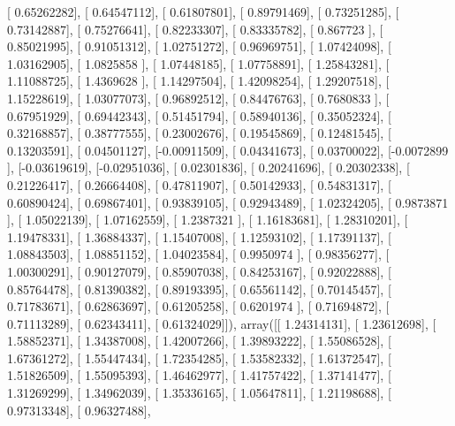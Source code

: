 \documentclass{article}
\begin{document}
       [ 0.65262282],
       [ 0.64547112],
       [ 0.61807801],
       [ 0.89791469],
       [ 0.73251285],
       [ 0.73142887],
       [ 0.75276641],
       [ 0.82233307],
       [ 0.83335782],
       [ 0.867723  ],
       [ 0.85021995],
       [ 0.91051312],
       [ 1.02751272],
       [ 0.96969751],
       [ 1.07424098],
       [ 1.03162905],
       [ 1.0825858 ],
       [ 1.07448185],
       [ 1.07758891],
       [ 1.25843281],
       [ 1.11088725],
       [ 1.4369628 ],
       [ 1.14297504],
       [ 1.42098254],
       [ 1.29207518],
       [ 1.15228619],
       [ 1.03077073],
       [ 0.96892512],
       [ 0.84476763],
       [ 0.7680833 ],
       [ 0.67951929],
       [ 0.69442343],
       [ 0.51451794],
       [ 0.58940136],
       [ 0.35052324],
       [ 0.32168857],
       [ 0.38777555],
       [ 0.23002676],
       [ 0.19545869],
       [ 0.12481545],
       [ 0.13203591],
       [ 0.04501127],
       [-0.00911509],
       [ 0.04341673],
       [ 0.03700022],
       [-0.0072899 ],
       [-0.03619619],
       [-0.02951036],
       [ 0.02301836],
       [ 0.20241696],
       [ 0.20302338],
       [ 0.21226417],
       [ 0.26664408],
       [ 0.47811907],
       [ 0.50142933],
       [ 0.54831317],
       [ 0.60890424],
       [ 0.69867401],
       [ 0.93839105],
       [ 0.92943489],
       [ 1.02324205],
       [ 0.9873871 ],
       [ 1.05022139],
       [ 1.07162559],
       [ 1.2387321 ],
       [ 1.16183681],
       [ 1.28310201],
       [ 1.19478331],
       [ 1.36884337],
       [ 1.15407008],
       [ 1.12593102],
       [ 1.17391137],
       [ 1.08843503],
       [ 1.08851152],
       [ 1.04023584],
       [ 0.9950974 ],
       [ 0.98356277],
       [ 1.00300291],
       [ 0.90127079],
       [ 0.85907038],
       [ 0.84253167],
       [ 0.92022888],
       [ 0.85764478],
       [ 0.81390382],
       [ 0.89193395],
       [ 0.65561142],
       [ 0.70145457],
       [ 0.71783671],
       [ 0.62863697],
       [ 0.61205258],
       [ 0.6201974 ],
       [ 0.71694872],
       [ 0.71113289],
       [ 0.62343411],
       [ 0.61324029]]), array([[ 1.24314131],
       [ 1.23612698],
       [ 1.58852371],
       [ 1.34387008],
       [ 1.42007266],
       [ 1.39893222],
       [ 1.55086528],
       [ 1.67361272],
       [ 1.55447434],
       [ 1.72354285],
       [ 1.53582332],
       [ 1.61372547],
       [ 1.51826509],
       [ 1.55095393],
       [ 1.46462977],
       [ 1.41757422],
       [ 1.37141477],
       [ 1.31269299],
       [ 1.34962039],
       [ 1.35336165],
       [ 1.05647811],
       [ 1.21198688],
       [ 0.97313348],
       [ 0.96327488],
\end{document}
